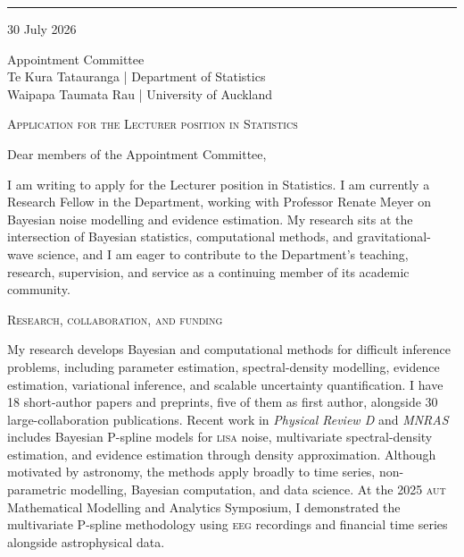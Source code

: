 \documentclass[a4paper,11pt]{article}
\newcommand{\acronym}[1]{\textsc{#1}}
\newcommand{\block}[1]{%
    \vspace{0.55em}%
    {\color{color-title}\scshape #1}\par
    \vspace{-0.35em}}
\begin{document}

\vspace{0.4em}
{\color{color-title}\rule{\textwidth}{0.45pt}}

\vspace{0.8em}

{\hfill 30 July 2026}

\vspace{0.4em}

Appointment Committee\\
Te Kura Tatauranga | Department of Statistics\\
Waipapa Taumata Rau | University of Auckland

\vspace{0.9em}

{\large\color{color-title}\textsc{Application for the Lecturer position in
Statistics}}

\vspace{0.4em}

Dear members of the Appointment Committee,

I am writing to apply for the Lecturer position in Statistics. I am currently a
Research Fellow in the Department, working with Professor Renate Meyer on
Bayesian noise modelling and evidence estimation. My research sits at the
intersection of Bayesian statistics, computational methods, and
gravitational-wave science, and I am eager to contribute to the Department's
teaching, research, supervision, and service as a continuing member of its
academic community.

\block{Research, collaboration, and funding}

My research develops Bayesian and computational methods for difficult
inference problems, including parameter estimation, spectral-density
modelling, evidence estimation, variational inference, and scalable
uncertainty quantification. I have 18 short-author papers and preprints, five
of them as first author, alongside 30 large-collaboration
publications. Recent work in \emph{Physical Review D} and \emph{MNRAS} includes
Bayesian P-spline models for \acronym{lisa} noise, multivariate spectral-density
estimation, and evidence estimation through density approximation.
Although motivated by astronomy, the methods apply broadly to time
series, non-parametric modelling, Bayesian computation, and data science. At
the 2025 \acronym{aut} Mathematical Modelling and Analytics Symposium, I
demonstrated the multivariate P-spline methodology using \acronym{eeg}
recordings and financial time series alongside astrophysical data.
\end{document}

